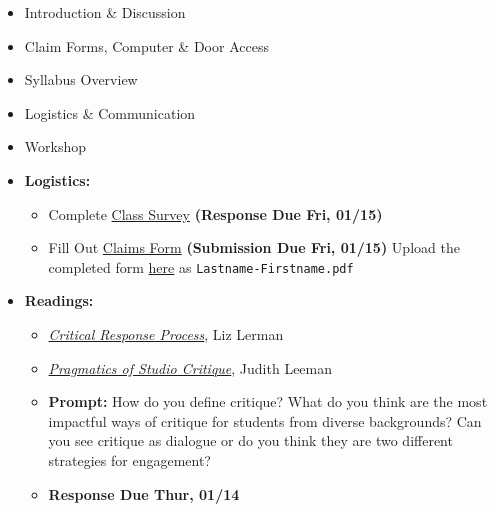 \def\dMon{Mon, 01/11}
\def\dTues{Tues, 01/12}
\def\dWed{Wed, 01/13}
\def\dThur{Thur, 01/14}
\def\dFri{Fri, 01/15}
\def\dSat{Sat, 01/16}
\def\dSun{Sun, 01/17}
\placeDate

\begin{itemize}[noitemsep,topsep=0pt,leftmargin=*]
      \item Introduction \& Discussion
      \item Claim Forms, Computer \& Door Access
      \item Syllabus Overview
      \item Logistics \& Communication
      \item Workshop
\end{itemize}
\vspace{1em}
\begin{itemize}[noitemsep,topsep=0pt,leftmargin=*]
      \item \textbf{Logistics:}
            \begin{itemize}
                  \item Complete \href{https://forms.gle/MnFLmcqK7PUiKwra7}{Class Survey} \textbf{(Response Due \dFri)}
                  \item Fill Out \href{https://drive.google.com/file/d/1SeksTmFmQa6uehrmoSIL_uO8tuORo0P3/view}{Claims Form} \textbf{(Submission Due \dFri)}
                        \newline Upload the completed form \href{https://osu.app.box.com/f/eb897914f2e94a08aace11a93668c046}{here} as \texttt{Lastname-Firstname.pdf}
            \end{itemize}
      \item \textbf{Readings:}
            \begin{itemize}
                  \item \emph{\href{https://drive.google.com/file/d/1tnvKJBaXn2kFXjp-KB8p0_dkKuw1R4fu/view?usp=sharing}{Critical Response Process}}, Liz Lerman
                  \item \emph{\href{https://drive.google.com/file/d/1vUej0gK5nckVl6hvf68lcHJrh1w73h12/view?usp=sharing}{Pragmatics of Studio Critique}}, Judith Leeman
                  \item \textbf{Prompt:} How do you define critique? What do you think are the most impactful ways of critique for students from diverse backgrounds? Can you see critique as dialogue or do you think they are two different strategies for engagement?
                  \item \textbf{Response Due \dThur}

\end{itemize}
\end{itemize}
